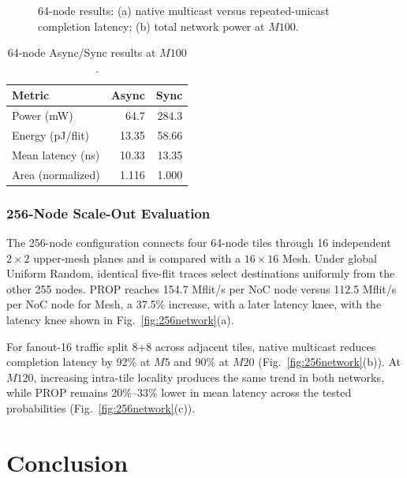 \documentclass[conference]{IEEEtran}
\begin{document}
\begin{figure}[t]
\centering

\caption{64-node results: (a) native multicast versus repeated-unicast completion latency; (b) total network power at \(M100\).}
\label{fig:64-multicast-power}
\end{figure}

\begin{table}[t]
\caption{64-node Async/Sync results at \(M100\).}
\label{tab:async-sync-network}
\centering
\scriptsize
\setlength{\tabcolsep}{4.5pt}
\begin{tabular}{lrr}
\toprule
Metric & Async & Sync \\
\midrule
Power (mW) & 64.7 & 284.3 \\
Energy (pJ/flit) & 13.35 & 58.66 \\
Mean latency (ns) & 10.33 & 13.35 \\
Area (normalized) & 1.116 & 1.000 \\
\bottomrule
\end{tabular}
\end{table}

\subsubsection{256-Node Scale-Out Evaluation}

The 256-node configuration connects four 64-node tiles through 16 independent
\(2\times2\) upper-mesh planes and is compared with a \(16\times16\) Mesh.
Under global Uniform Random, identical five-flit traces select destinations
uniformly from the other 255 nodes. PROP reaches 154.7 Mflit/s per NoC node
versus 112.5 Mflit/s per NoC node for Mesh, a 37.5\% increase, with a later latency knee,
with the latency knee shown in Fig.~\ref{fig:256network}(a).

For fanout-16 traffic split 8+8 across adjacent tiles, native multicast
reduces completion latency by 92\% at \(M5\) and 90\% at \(M20\)
(Fig.~\ref{fig:256network}(b)). At \(M120\), increasing intra-tile locality
produces the same trend in both networks, while PROP remains 20\%--33\%
lower in mean latency across the tested probabilities (Fig.~\ref{fig:256network}(c)).

\section{Conclusion}\label{sec:conclusion}
\end{document}
